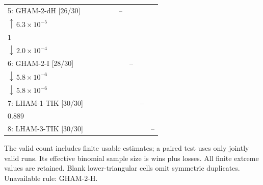 \begin{table}[!htbp]
{\begin{tabular}{@{}l*{8}{c}@{}}
5: GHAM-2-dH [26/30] &  &  &  &  & -- & \shortstack{$23{:}1{:}0$\\$\uparrow\,6.3\!\times\!10^{-5}$} & \shortstack{$15{:}11{:}0$\\$1$} & \shortstack{$2{:}24{:}0$\\$\downarrow\,2.0\!\times\!10^{-4}$} \\
6: GHAM-2-I [28/30] &  &  &  &  &  & -- & \shortstack{$1{:}27{:}0$\\$\downarrow\,5.8\!\times\!10^{-6}$} & \shortstack{$1{:}27{:}0$\\$\downarrow\,5.8\!\times\!10^{-6}$} \\
7: LHAM-1-TIK [30/30] &  &  &  &  &  &  & -- & \shortstack{$10{:}20{:}0$\\$0.889$} \\
8: LHAM-3-TIK [30/30] &  &  &  &  &  &  &  & -- \\
\bottomrule
\end{tabular}%
}
\endgroup
\par\smallskip
\begin{minipage}{\linewidth}\footnotesize
The valid count includes finite usable estimates; a paired test uses only jointly valid runs. Its effective binomial sample size is wins plus losses. All finite extreme values are retained. Blank lower-triangular cells omit symmetric duplicates.
Unavailable rule: GHAM-2-H.
\end{minipage}
\end{table}

